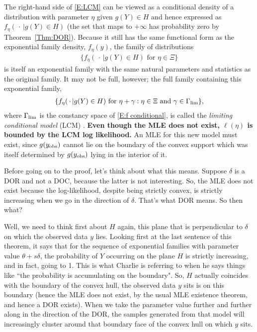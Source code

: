 The right-hand side of \eqref{E:LCM} can be viewed as a conditional density of a 
distribution with parameter $\eta$ given $g(Y) \in H$ and hence expressed as $f_{\eta}
(\, \cdot\,  | g(Y) \in H)$ (the set that maps to $+\infty$ has probability zero by 
Theorem~\ref{Thm:DOR}).  Because it still has the same functional form as the 
exponential family density, $f_\eta(y)$, the family of distributions
\begin{align} \label{E:f conditional}
\{ f_{\eta}(\, \cdot\,  | g(Y) \in H) \text{ for } \eta \in \Xi \}
\end{align}
is itself an exponential family with the same natural parameters and statistics as the 
original family.  
It may not be full, however; the full family containing this exponential family,
\begin{align*}
\{ f_{\eta}(\, \cdot\,  | g(Y) \in H) \text{ for }  \eta + \gamma: \eta \in \Xi \text
{ and } \gamma \in \Gamma_{\textrm{lim}} \},
\end{align*}
where $\Gamma_{\textrm{lim}}$ is the constancy space of \eqref{E:f conditional},
is called the \emph{limiting conditional model} (LCM) \citep{Geyer:gdor}.  
\textbf{Even though the MLE does not exist, $\ell(\eta)$ is bounded by the LCM log 
likelihood.}
An MLE for this new model must exist, since $g(y_{\textrm{obs}})$ cannot lie on the boundary of 
the convex support which was itself determined by $g(y_{\textrm{obs}})$ lying in the interior of 
it.  

Before going on to the proof, let's think about what this means.  Suppose $\delta$ is 
a DOR and not a DOC, because the latter is not interesting.  So, the MLE does not 
exist because the log-likelihood, despite being strictly convex, is strictly 
increasing when we go in the direction of $\delta$.  That's what DOR means.  So then 
what?

Well, we need to think first about $H$ again, this plane that is perpendicular to $
\delta$ on which the observed data $y$ lies.  Looking first at the last sentence of 
this theorem, it says that for the sequence of exponential families with parameter 
value $\theta+s\delta$, the probability of $Y$ occurring on the plane $H$ is strictly 
increasing, and in fact, going to 1.  This is what Charlie is referring to when he 
says things like ``the probability is accumulating on the boundary".  So, $H$ 
actually coincides with the boundary of the convex hull, the observed data $y$ sits 
is on this boundary (hence the MLE does not exist, by the usual MLE existence 
theorem, and hence a DOR exists).  When we take the parameter value further and 
further along in the direction of the DOR, the samples generated from that model will 
increasingly cluster around that boundary face of the convex hull on which $y$ 
sits.

